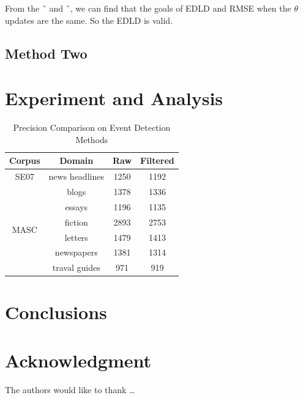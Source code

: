 From the ˜ and ˜, 
we can find that the goals of EDLD and  RMSE
when the $ \theta $ updates are the same.
So the EDLD is valid.
   

\subsection{Method Two}





\section{Experiment and Analysis} \label{sec-experiment}


\begin{table} [htbp] \centering
  \caption{Precision Comparison on Event Detection Methods}
  \label{tbl:overall-experiments}
  \begin{tabular}{cccc}
\toprule
Corpus & Domain  & Raw & Filtered  \\
\midrule
SE07 &  news headlines &  1250 &  1192 \\
\hline
\multirow{6}{*}{MASC} &  blogs&  1378&  1336\\
&  essays &  1196 &  1135 \\
&  fiction &  2893 &  2753 \\
&  letters &  1479 &  1413 \\
& newspapers & 1381 & 1314 \\
& traval guides & 971 & 919 \\
\bottomrule
\end{tabular}
\end{table}


\section{Conclusions} \label{sec-conclusions}



\section*{Acknowledgment}

\lipsum[1]


The authors would like to thank \ldots

